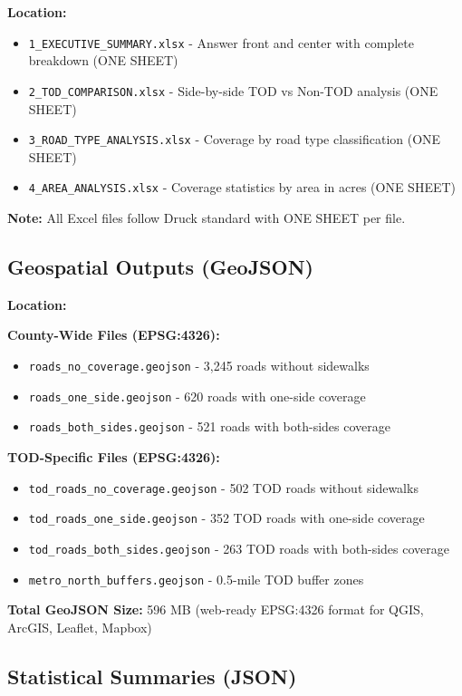 \documentclass[11pt,letterpaper]{article}
\begin{document}
\textbf{Location:} \texttt{}

\begin{itemize}
    \item \texttt{1\_EXECUTIVE\_SUMMARY.xlsx} - Answer front and center with complete breakdown (ONE SHEET)
    \item \texttt{2\_TOD\_COMPARISON.xlsx} - Side-by-side TOD vs Non-TOD analysis (ONE SHEET)
    \item \texttt{3\_ROAD\_TYPE\_ANALYSIS.xlsx} - Coverage by road type classification (ONE SHEET)
    \item \texttt{4\_AREA\_ANALYSIS.xlsx} - Coverage statistics by area in acres (ONE SHEET)
\end{itemize}

\textbf{Note:} All Excel files follow Druck standard with ONE SHEET per file.

\subsection{Geospatial Outputs (GeoJSON)}

\textbf{Location:} \texttt{}

\textbf{County-Wide Files (EPSG:4326):}
\begin{itemize}
    \item \texttt{roads\_no\_coverage.geojson} - 3,245 roads without sidewalks
    \item \texttt{roads\_one\_side.geojson} - 620 roads with one-side coverage
    \item \texttt{roads\_both\_sides.geojson} - 521 roads with both-sides coverage
\end{itemize}

\textbf{TOD-Specific Files (EPSG:4326):}
\begin{itemize}
    \item \texttt{tod\_roads\_no\_coverage.geojson} - 502 TOD roads without sidewalks
    \item \texttt{tod\_roads\_one\_side.geojson} - 352 TOD roads with one-side coverage
    \item \texttt{tod\_roads\_both\_sides.geojson} - 263 TOD roads with both-sides coverage
    \item \texttt{metro\_north\_buffers.geojson} - 0.5-mile TOD buffer zones
\end{itemize}

\textbf{Total GeoJSON Size:} 596 MB (web-ready EPSG:4326 format for QGIS, ArcGIS, Leaflet, Mapbox)

\subsection{Statistical Summaries (JSON)}
\end{document}
